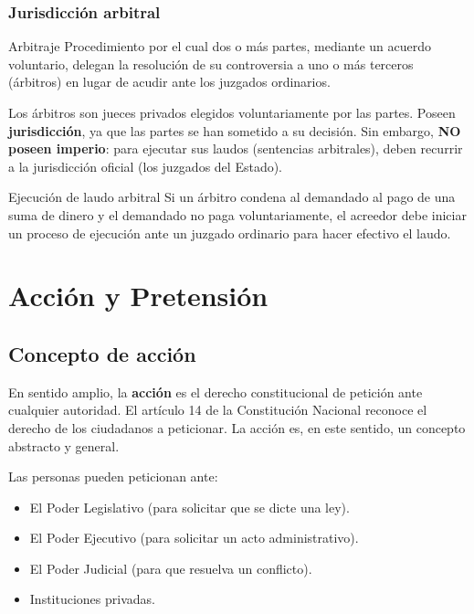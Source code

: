 \documentclass[12pt,oneside]{book}
\begin{document}
\subsubsection{Jurisdicción arbitral}

\begin{definition}{Arbitraje}
Procedimiento por el cual dos o más partes, mediante un acuerdo voluntario, delegan la resolución de su controversia a uno o más terceros (árbitros) en lugar de acudir ante los juzgados ordinarios.
\end{definition}

Los árbitros son jueces privados elegidos voluntariamente por las partes. Poseen \textbf{jurisdicción}, ya que las partes se han sometido a su decisión. Sin embargo, \textbf{NO poseen imperio}: para ejecutar sus laudos (sentencias arbitrales), deben recurrir a la jurisdicción oficial (los juzgados del Estado).

\begin{example}{Ejecución de laudo arbitral}
Si un árbitro condena al demandado al pago de una suma de dinero y el demandado no paga voluntariamente, el acreedor debe iniciar un proceso de ejecución ante un juzgado ordinario para hacer efectivo el laudo.
\end{example}

\section{Acción y Pretensión}

\subsection{Concepto de acción}

En sentido amplio, la \textbf{acción} es el derecho constitucional de petición ante cualquier autoridad. El artículo 14 de la Constitución Nacional reconoce el derecho de los ciudadanos a peticionar. La acción es, en este sentido, un concepto abstracto y general.

Las personas pueden peticionan ante:
\begin{itemize}
    \item El Poder Legislativo (para solicitar que se dicte una ley).
    \item El Poder Ejecutivo (para solicitar un acto administrativo).
    \item El Poder Judicial (para que resuelva un conflicto).
    \item Instituciones privadas.
\end{itemize}
\end{document}
